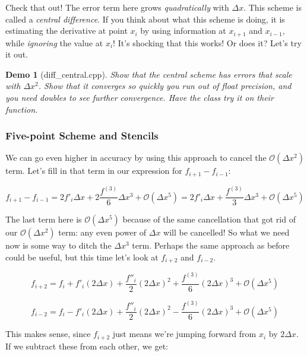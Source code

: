 \documentclass{article}
\theoremstyle{demo}
\newtheorem{demo}{Demo}[section]
\begin{document}
Check that out! The error term here grows \textit{quadratically} with $\Delta
x$.  This scheme is called a \textit{central difference}.  If you think about
what this scheme is doing, it is estimating the derivative at point $x_i$ by
using information at $x_{i+1}$ and $x_{i-1}$, while \textit{ignoring} the value
at $x_i$!  It's shocking that this works!  Or does it?  Let's try it out.

\begin{demo}[diff\_central.cpp]
    Show that the central scheme has errors that scale with $\Delta x^2$.  Show
    that it converges so quickly you run out of float precision, and you need
    doubles to see further convergence.  Have the class try it on their
    function.  
\end{demo}

\subsubsection{Five-point Scheme and Stencils}
We can go even higher in accuracy by using this approach to cancel the
$\mathcal{O}(\Delta x^2)$ term.  Let's fill in that term in our expression for
$f_{i+1} - f_{i-1}$:

\begin{equation}
    f_{i+1} - f_{i-1} = 2f'_i \Delta x + 2 \frac{f^{(3)}}{6} \Delta x^3 +
    \mathcal{O}(\Delta x^5) = 2f'_i \Delta x + \frac{f^{(3)}}{3} \Delta x^3 +
    \mathcal{O}(\Delta x^5)
\end{equation}

The last term here is $\mathcal{O}(\Delta x^5)$ because of the same cancellation
that got rid of our $\mathcal{O}(\Delta x^2)$ term: any even power of $\Delta x$
will be cancelled!  So what we need now is some way to ditch the $\Delta x^3$
term.  Perhaps the same approach as before could be useful, but this time let's
look at $f_{i+2}$ and $f_{i-2}$.

\begin{equation}
    f_{i+2} = f_i + f'_i (2 \Delta x) + \frac{f''_i}{2}(2 \Delta x)^2 +
    \frac{f^{(3)}}{6} (2 \Delta x)^3 + \mathcal{O}(\Delta x^5)
\end{equation}

\begin{equation}
    f_{i-2} = f_i - f'_i (2 \Delta x) + \frac{f''_i}{2}(2 \Delta x)^2 -
    \frac{f^{(3)}}{6} (2 \Delta x)^3 + \mathcal{O}(\Delta x^5)
\end{equation}


This makes sense, since $f_{i+2}$ just means we're jumping forward from $x_i$ by
$2\Delta x$.  If we subtract these from each other, we get:
\end{document}
